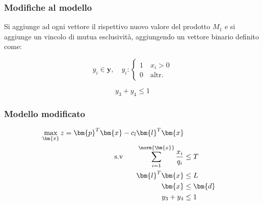 \documentclass[\main/main.tex]{subfiles}
\begin{document}
\subsubsection*{Modifiche al modello}
Si aggiunge ad ogni vettore il rispettivo nuovo valore del prodotto $M_1$ e si aggiunge un vincolo di mutua esclusività, aggiungendo un vettore binario definito come:

\[
  y_i \in \bm{y}, \quad y_i: \begin{cases}
    1\quad x_i > 0 \\
    0\quad \text{altr.}
  \end{cases}
\]

\[
  y_3 + y_4 \leq 1
\]

\subsubsection*{Modello modificato}

\begin{align*}
  \max_{\bm{x}} z = \bm{p}^T\bm{x} - c_l\bm{l}^T\bm{x}                       \\
  \text{s.v} \qquad \sum_{i=1}^{\norm{\bm{x}}} \frac{x_i}{q_i} & \leq T      \\
  \bm{l}^T\bm{x}                                               & \leq L      \\
  \bm{x}                                                       & \leq \bm{d} \\
  y_3 + y_4                                                    & \leq 1      \\
\end{align*}
\end{document}
